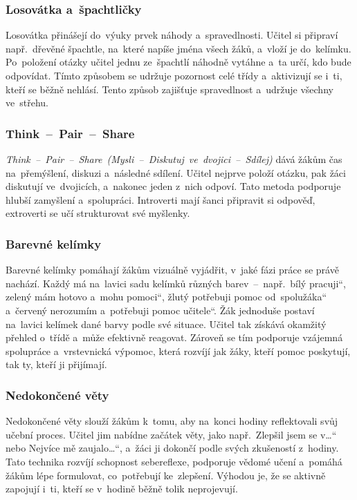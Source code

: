 \documentclass[male,czech,api_bc]{kitheses}
\begin{document}
\subsubsection{Losovátka a~špachtličky}

Losovátka přinášejí do~výuky prvek náhody a~spravedlnosti. Učitel si připraví např.~dřevěné špachtle, na~které napíše jména všech žáků, a~vloží je do~kelímku. Po~položení otázky učitel jednu ze~špachtlí náhodně vytáhne a~ta určí, kdo bude odpovídat. Tímto způsobem se udržuje pozornost celé třídy a~aktivizují se i~ti, kteří se běžně nehlásí. Tento způsob zajišťuje spravedlnost a~udržuje všechny ve~střehu.

\subsubsection{Think~--~Pair~--~Share}

\textit{Think~--~Pair~--~Share~(Mysli~--~Diskutuj~ve~dvojici~--~Sdílej)} dává žákům čas na~přemýšlení, diskuzi a~následné sdílení. Učitel nejprve položí otázku, pak žáci diskutují ve~dvojicích, a~nakonec jeden z~nich odpoví. Tato metoda podporuje hlubší zamyšlení a~spolupráci. Introverti mají šanci připravit si odpověď, extroverti se učí strukturovat své myšlenky.

\subsubsection{Barevné kelímky}

Barevné kelímky pomáhají žákům vizuálně vyjádřit, v~jaké fázi práce se právě nachází. Každý má na~lavici sadu kelímků různých barev~--~např.~bílý \quotedblbase pracuji``, zelený \quotedblbase mám hotovo a~mohu pomoci``, žlutý \quotedblbase potřebuji pomoc od~spolužáka`` a~červený \quotedblbase nerozumím a~potřebuji pomoc učitele``. Žák jednoduše postaví na~lavici kelímek dané barvy podle své situace. Učitel tak získává okamžitý přehled o~třídě a~může efektivně reagovat. Zároveň se tím podporuje vzájemná spolupráce a~vrstevnická výpomoc, která rozvíjí jak žáky, kteří pomoc poskytují, tak ty, kteří ji přijímají.

\subsubsection{Nedokončené věty}

Nedokončené věty slouží žákům k~tomu, aby na~konci hodiny reflektovali svůj učební proces. Učitel jim nabídne začátek věty, jako např.~\quotedblbase Zlepšil jsem se v\ldots`` nebo \quotedblbase Nejvíce mě zaujalo\ldots``, a~žáci ji dokončí podle svých zkušeností z~hodiny. Tato technika rozvíjí schopnost sebereflexe, podporuje vědomé učení a~pomáhá žákům lépe formulovat, co~potřebují ke~zlepšení. Výhodou je, že se aktivně zapojují i~ti, kteří se v~hodině běžně tolik neprojevují.
\end{document}

